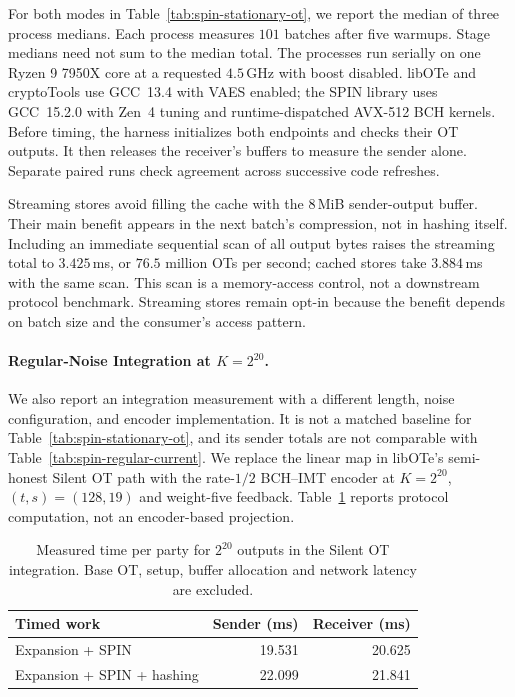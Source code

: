 For both modes in Table~\ref{tab:spin-stationary-ot}, we report the median
of three process medians.
Each process measures $101$ batches after five warmups. Stage medians need not sum to
the median total. The processes run serially on one Ryzen 9 7950X core
at a requested $4.5$\,GHz with boost disabled. libOTe and cryptoTools use
GCC~13.4 with VAES enabled; the SPIN library uses GCC~15.2.0 with Zen~4 tuning
and runtime-dispatched AVX-512 BCH kernels.
Before timing, the harness initializes both endpoints and checks their OT
outputs. It then releases the receiver's buffers to measure the sender alone.
Separate paired runs check agreement across successive code refreshes.

Streaming stores avoid filling the cache with the $8$\,MiB sender-output
buffer. Their main benefit appears in the next batch's compression, not
in hashing itself. Including an immediate sequential scan of all output bytes
raises the streaming total to $3.425$\,ms, or $76.5$ million OTs per second;
cached stores take $3.884$\,ms with the same scan.
This scan is a memory-access control, not a downstream protocol benchmark.
Streaming stores remain opt-in because the benefit depends on batch size
and the consumer's access pattern.

\paragraph{Regular-Noise Integration at $K=2^{20}$.}
We also report an integration measurement with a different length, noise
configuration, and encoder implementation. It is not a matched baseline for
Table~\ref{tab:spin-stationary-ot}, and its sender totals are not comparable
with Table~\ref{tab:spin-regular-current}.
We replace the linear map in libOTe's semi-honest Silent OT path with the
rate-$1/2$ BCH--IMT encoder at $K=2^{20}$, $(t,s)=(128,19)$ and weight-five
feedback. Table~\ref{tab:spin-ot} reports protocol computation, not an
encoder-based projection.

\begin{table}[!htbp]
\centering
\caption{Measured time per party for $2^{20}$ outputs in the Silent OT
integration. Base OT, setup, buffer allocation and network latency are excluded.}
\label{tab:spin-ot}
\begin{tabular}{@{}lrr@{}}
\toprule
Timed work & Sender (ms) & Receiver (ms) \\
\midrule
Expansion + SPIN & 19.531 & 20.625 \\
Expansion + SPIN + hashing & 22.099 & 21.841 \\
\bottomrule
\end{tabular}
\end{table}

